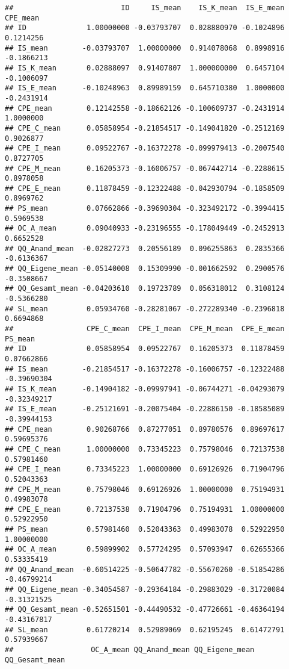 \documentclass[
]{article}
\begin{document}
\begin{verbatim}
##                         ID     IS_mean    IS_K_mean  IS_E_mean   CPE_mean
## ID              1.00000000 -0.03793707  0.028880970 -0.1024896  0.1214256
## IS_mean        -0.03793707  1.00000000  0.914078068  0.8998916 -0.1866213
## IS_K_mean       0.02888097  0.91407807  1.000000000  0.6457104 -0.1006097
## IS_E_mean      -0.10248963  0.89989159  0.645710380  1.0000000 -0.2431914
## CPE_mean        0.12142558 -0.18662126 -0.100609737 -0.2431914  1.0000000
## CPE_C_mean      0.05858954 -0.21854517 -0.149041820 -0.2512169  0.9026877
## CPE_I_mean      0.09522767 -0.16372278 -0.099979413 -0.2007540  0.8727705
## CPE_M_mean      0.16205373 -0.16006757 -0.067442714 -0.2288615  0.8978058
## CPE_E_mean      0.11878459 -0.12322488 -0.042930794 -0.1858509  0.8969762
## PS_mean         0.07662866 -0.39690304 -0.323492172 -0.3994415  0.5969538
## OC_A_mean       0.09040933 -0.23196555 -0.178049449 -0.2452913  0.6652528
## QQ_Anand_mean  -0.02827273  0.20556189  0.096255863  0.2835366 -0.6136367
## QQ_Eigene_mean -0.05140008  0.15309990 -0.001662592  0.2900576 -0.3508667
## QQ_Gesamt_mean -0.04203610  0.19723789  0.056318012  0.3108124 -0.5366280
## SL_mean         0.05934760 -0.28281067 -0.272289340 -0.2396818  0.6694868
##                 CPE_C_mean  CPE_I_mean  CPE_M_mean  CPE_E_mean     PS_mean
## ID              0.05858954  0.09522767  0.16205373  0.11878459  0.07662866
## IS_mean        -0.21854517 -0.16372278 -0.16006757 -0.12322488 -0.39690304
## IS_K_mean      -0.14904182 -0.09997941 -0.06744271 -0.04293079 -0.32349217
## IS_E_mean      -0.25121691 -0.20075404 -0.22886150 -0.18585089 -0.39944153
## CPE_mean        0.90268766  0.87277051  0.89780576  0.89697617  0.59695376
## CPE_C_mean      1.00000000  0.73345223  0.75798046  0.72137538  0.57981460
## CPE_I_mean      0.73345223  1.00000000  0.69126926  0.71904796  0.52043363
## CPE_M_mean      0.75798046  0.69126926  1.00000000  0.75194931  0.49983078
## CPE_E_mean      0.72137538  0.71904796  0.75194931  1.00000000  0.52922950
## PS_mean         0.57981460  0.52043363  0.49983078  0.52922950  1.00000000
## OC_A_mean       0.59899902  0.57724295  0.57093947  0.62655366  0.53335419
## QQ_Anand_mean  -0.60514225 -0.50647782 -0.55670260 -0.51854286 -0.46799214
## QQ_Eigene_mean -0.34054587 -0.29364184 -0.29883029 -0.31720084 -0.31321525
## QQ_Gesamt_mean -0.52651501 -0.44490532 -0.47726661 -0.46364194 -0.43167817
## SL_mean         0.61720214  0.52989069  0.62195245  0.61472791  0.57939667
##                  OC_A_mean QQ_Anand_mean QQ_Eigene_mean QQ_Gesamt_mean

\end{verbatim}
\end{document}
